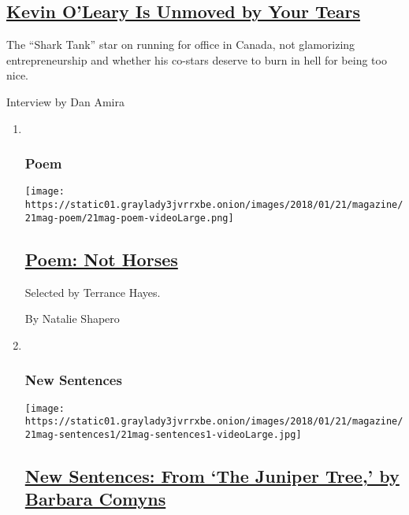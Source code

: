 \begin{enumerate}
  \hypertarget{kevin-oleary-is-unmoved-by-your-tears}{%
  \subsection{\texorpdfstring{\href{/2018/01/17/magazine/kevin-oleary-is-unmoved-by-your-tears.html}{Kevin
  O'Leary Is Unmoved by Your
  Tears}}{Kevin O'Leary Is Unmoved by Your Tears}}\label{kevin-oleary-is-unmoved-by-your-tears}}

  The ``Shark Tank'' star on running for office in Canada, not
  glamorizing entrepreneurship and whether his co-stars deserve to burn
  in hell for being too nice.

  Interview by Dan Amira
\end{enumerate}

\begin{enumerate}
\def\labelenumi{\arabic{enumi}.}
\item ~
  \hypertarget{poem}{%
  \subsubsection{Poem}\label{poem}}

  \texttt{[image: https://static01.graylady3jvrrxbe.onion/images/2018/01/21/magazine/21mag-poem/21mag-poem-videoLarge.png]}

  \hypertarget{poem-not-horses}{%
  \subsection{\texorpdfstring{\href{/2018/01/19/magazine/poem-not-horses.html}{Poem:
  Not Horses}}{Poem: Not Horses}}\label{poem-not-horses}}

  Selected by Terrance Hayes.

  By Natalie Shapero
\item ~
  \hypertarget{new-sentences}{%
  \subsubsection{New Sentences}\label{new-sentences}}

  \texttt{[image: https://static01.graylady3jvrrxbe.onion/images/2018/01/21/magazine/21mag-sentences1/21mag-sentences1-videoLarge.jpg]}

  \hypertarget{new-sentences-from-the-juniper-tree-by-barbara-comyns}{%
  \subsection{\texorpdfstring{\href{/2018/01/19/magazine/new-sentences-from-the-juniper-tree-by-barbara-comyns.html}{New
  Sentences: From `The Juniper Tree,' by Barbara
  Comyns}}{New Sentences: From `The Juniper Tree,' by Barbara Comyns}}\label{new-sentences-from-the-juniper-tree-by-barbara-comyns}}


\end{enumerate}
